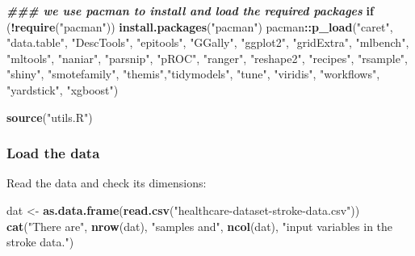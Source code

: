 \documentclass[
]{article}
\newenvironment{Shaded}{\begin{snugshade}}{\end{snugshade}}
\newcommand{\ControlFlowTok}[1]{\textcolor[rgb]{0.13,0.29,0.53}{\textbf{#1}}}
\newcommand{\DocumentationTok}[1]{\textcolor[rgb]{0.56,0.35,0.01}{\textbf{\textit{#1}}}}
\newcommand{\FunctionTok}[1]{\textcolor[rgb]{0.13,0.29,0.53}{\textbf{#1}}}
\newcommand{\NormalTok}[1]{#1}
\newcommand{\OtherTok}[1]{\textcolor[rgb]{0.56,0.35,0.01}{#1}}
\newcommand{\SpecialCharTok}[1]{\textcolor[rgb]{0.81,0.36,0.00}{\textbf{#1}}}
\newcommand{\StringTok}[1]{\textcolor[rgb]{0.31,0.60,0.02}{#1}}
\begin{document}
\begin{Shaded}
\begin{Highlighting}[]
\DocumentationTok{\#\#\# we use pacman to install and load the required packages}
\ControlFlowTok{if}\NormalTok{ (}\SpecialCharTok{!}\FunctionTok{require}\NormalTok{(}\StringTok{"pacman"}\NormalTok{)) }\FunctionTok{install.packages}\NormalTok{(}\StringTok{"pacman"}\NormalTok{)}
\NormalTok{pacman}\SpecialCharTok{::}\FunctionTok{p\_load}\NormalTok{(}\StringTok{"caret"}\NormalTok{, }\StringTok{"data.table"}\NormalTok{, }\StringTok{"DescTools"}\NormalTok{, }\StringTok{"epitools"}\NormalTok{, }\StringTok{"GGally"}\NormalTok{, }\StringTok{"ggplot2"}\NormalTok{, }\StringTok{"gridExtra"}\NormalTok{, }\StringTok{"mlbench"}\NormalTok{, }\StringTok{"mltools"}\NormalTok{, }\StringTok{"naniar"}\NormalTok{, }\StringTok{"parsnip"}\NormalTok{, }\StringTok{"pROC"}\NormalTok{, }\StringTok{"ranger"}\NormalTok{, }\StringTok{"reshape2"}\NormalTok{, }\StringTok{"recipes"}\NormalTok{, }\StringTok{"rsample"}\NormalTok{, }\StringTok{"shiny"}\NormalTok{, }\StringTok{"smotefamily"}\NormalTok{, }\StringTok{"themis"}\NormalTok{,}\StringTok{"tidymodels"}\NormalTok{, }\StringTok{"tune"}\NormalTok{, }\StringTok{"viridis"}\NormalTok{, }\StringTok{"workflows"}\NormalTok{, }\StringTok{"yardstick"}\NormalTok{, }\StringTok{"xgboost"}\NormalTok{)}

\FunctionTok{source}\NormalTok{(}\StringTok{"utils.R"}\NormalTok{)}
\end{Highlighting}
\end{Shaded}

\subsubsection{Load the data}\label{load-the-data}

Read the data and check its dimensions:

\begin{Shaded}
\begin{Highlighting}[]
\NormalTok{dat }\OtherTok{\textless{}{-}} \FunctionTok{as.data.frame}\NormalTok{(}\FunctionTok{read.csv}\NormalTok{(}\StringTok{"healthcare{-}dataset{-}stroke{-}data.csv"}\NormalTok{))}
\FunctionTok{cat}\NormalTok{(}\StringTok{"There are"}\NormalTok{, }\FunctionTok{nrow}\NormalTok{(dat), }\StringTok{"samples and"}\NormalTok{, }\FunctionTok{ncol}\NormalTok{(dat), }\StringTok{"input variables in the stroke data."}\NormalTok{)}
\end{Highlighting}
\end{Shaded}
\end{document}
